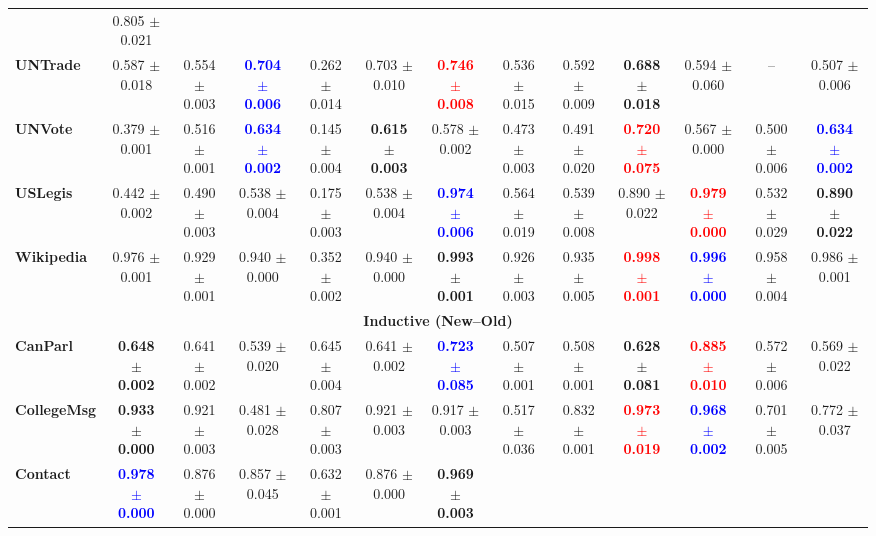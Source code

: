 {\begin{tabular}{lccccc|ccccccc}
& 0.805 $\pm$ 0.021 \\
\textbf{UNTrade} 
& 0.587 $\pm$ 0.018
& 0.554 $\pm$ 0.003 
& \textcolor{blue}{\textbf{0.704 $\pm$ 0.006 }}
& 0.262 $\pm$ 0.014 
& 0.703 $\pm$ 0.010 
& \textcolor{red}{\textbf{0.746 $\pm$ 0.008 }}
& 0.536 $\pm$ 0.015 
& 0.592 $\pm$ 0.009 
& \textbf{0.688 $\pm$ 0.018 }
& 0.594 $\pm$ 0.060 
& -- 
& 0.507 $\pm$ 0.006  \\
\textbf{UNVote} 
& 0.379 $\pm$ 0.001 
& 0.516 $\pm$ 0.001 
& \textcolor{blue}{\textbf{0.634 $\pm$ 0.002 }}
& 0.145 $\pm$ 0.004 
& \textbf{0.615 $\pm$ 0.003 }
& 0.578 $\pm$ 0.002 
& 0.473 $\pm$ 0.003 
& 0.491 $\pm$ 0.020 
& \textcolor{red}{\textbf{0.720 $\pm$ 0.075 }}
& 0.567 $\pm$ 0.000 
& 0.500 $\pm$ 0.006 
& \textcolor{blue}{\textbf{0.634 $\pm$ 0.002 }} \\
\textbf{USLegis} 
& 0.442 $\pm$ 0.002
& 0.490 $\pm$ 0.003 
& 0.538 $\pm$ 0.004 
& 0.175 $\pm$ 0.003 
& 0.538 $\pm$ 0.004 
& \textcolor{blue}{\textbf{0.974 $\pm$ 0.006 }}
& 0.564 $\pm$ 0.019 
& 0.539 $\pm$ 0.008 
& 0.890 $\pm$ 0.022 
& \textcolor{red}{\textbf{0.979 $\pm$ 0.000 }}
& 0.532 $\pm$ 0.029 
& \textbf{0.890 $\pm$ 0.022 } \\
\textbf{Wikipedia} 
& 0.976 $\pm$ 0.001 
& 0.929 $\pm$ 0.001 
& 0.940 $\pm$ 0.000 
& 0.352 $\pm$ 0.002 
& 0.940 $\pm$ 0.000 
& \textbf{0.993 $\pm$ 0.001 } 
& 0.926 $\pm$ 0.003 
& 0.935 $\pm$ 0.005 
& \textcolor{red}{\textbf{0.998 $\pm$ 0.001 }} 
& \textcolor{blue}{\textbf{0.996 $\pm$ 0.000 }} 
& 0.958 $\pm$ 0.004 
& 0.986 $\pm$ 0.001 \\
\midrule
\multicolumn{13}{c}{\textbf{Inductive (New--Old)}}\\
\midrule
\textbf{CanParl} 
& \textbf{0.648 $\pm$ 0.002 }
& 0.641 $\pm$ 0.002 
& 0.539 $\pm$ 0.020 
& 0.645 $\pm$ 0.004 
& 0.641 $\pm$ 0.002 
& \textcolor{blue}{\textbf{0.723 $\pm$ 0.085 }}
& 0.507 $\pm$ 0.001 
& 0.508 $\pm$ 0.001 
& \textbf{0.628 $\pm$ 0.081 }
& \textcolor{red}{\textbf{0.885 $\pm$ 0.010 }}
& 0.572 $\pm$ 0.006 
& 0.569 $\pm$ 0.022  \\
\textbf{CollegeMsg} 
& \textbf{0.933 $\pm$ 0.000 }
& 0.921 $\pm$ 0.003 
& 0.481 $\pm$ 0.028 
& 0.807 $\pm$ 0.003 
& 0.921 $\pm$ 0.003 
& 0.917 $\pm$ 0.003 
& 0.517 $\pm$ 0.036 
& 0.832 $\pm$ 0.001 
& \textcolor{red}{\textbf{0.973 $\pm$ 0.019 }}
& \textcolor{blue}{\textbf{0.968 $\pm$ 0.002 }}
& 0.701 $\pm$ 0.005 
& 0.772 $\pm$ 0.037 \\
\textbf{Contact} 
& \textcolor{blue}{\textbf{0.978 $\pm$ 0.000 }}
& 0.876 $\pm$ 0.000 
& 0.857 $\pm$ 0.045 
& 0.632 $\pm$ 0.001 
& 0.876 $\pm$ 0.000 
& \textbf{0.969 $\pm$ 0.003 }

\end{tabular}}

